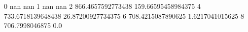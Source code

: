 0 nan nan
1 nan nan
2 866.4657592773438 159.66595458984375
4 733.6718139648438 26.87200927734375
6 708.4215087890625 1.6217041015625
8 706.7998046875 0.0
